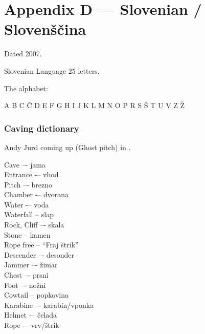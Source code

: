 \chapter{Appendix D --- Slovenian / Slovenščina}
Dated 2007.

Slovenian Language
25 letters.

The alphabet:

A B C Č D E F G H I J K L M N O P R S Š T U V Z Ž

\subsection{Caving dictionary}

\begin{marginfigure}
\checkoddpage \ifoddpage \forcerectofloat \else \forceversofloat \fi
\centering
 \caption{Andy Jurd coming up \protect{} (Ghost pitch) in \protect{}. }
 \label{brezno}
\end{marginfigure}

Cave –- jama\\
Entrance -– vhod\\
Pitch –- brezno\\
Chamber -– dvorana\\
Water -– voda\\
Waterfall -- slap\\
Rock, Cliff –- skala\\
Stone -- kamen\\
Rope free -- “Fraj štrik”\\
Descender –- desonder\\
Jammer –- žimar\\
Chest –- prsni\\
Foot –- nožni\\
Cowtail -- popkovina\\
Karabine –- karabin/vponka\\
Helmet -– čelada\\
Rope -– vrv/štrik\\


